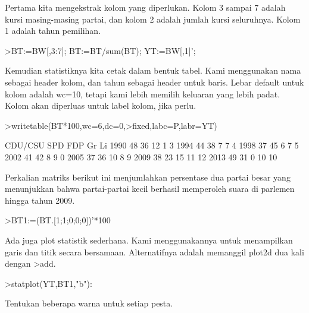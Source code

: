 \documentclass{article}
\begin{document}
\begin{eulernotebook}
\begin{eulercomment}
\begin{eulercomment}
\begin{eulercomment}
Pertama kita mengekstrak kolom yang diperlukan. Kolom 3 sampai 7
adalah kursi masing-masing partai, dan kolom 2 adalah jumlah kursi
seluruhnya. Kolom 1 adalah tahun pemilihan.
\end{eulercomment}
\begin{eulerprompt}
>BT:=BW[,3:7]; BT:=BT/sum(BT); YT:=BW[,1]';
\end{eulerprompt}
\begin{eulercomment}
Kemudian statistiknya kita cetak dalam bentuk tabel. Kami menggunakan
nama sebagai header kolom, dan tahun sebagai header untuk baris. Lebar
default untuk kolom adalah wc=10, tetapi kami lebih memilih keluaran
yang lebih padat. Kolom akan diperluas untuk label kolom, jika perlu.
\end{eulercomment}
\begin{eulerprompt}
>writetable(BT*100,wc=6,dc=0,>fixed,labc=P,labr=YT)
\end{eulerprompt}
\begin{euleroutput}
         CDU/CSU   SPD   FDP    Gr    Li
    1990      48    36    12     1     3
    1994      44    38     7     7     4
    1998      37    45     6     7     5
    2002      41    42     8     9     0
    2005      37    36    10     8     9
    2009      38    23    15    11    12
    2013      49    31     0    10    10
\end{euleroutput}
\begin{eulercomment}
Perkalian matriks berikut ini menjumlahkan persentase dua partai besar
yang menunjukkan bahwa partai-partai kecil berhasil memperoleh suara
di parlemen hingga tahun 2009.
\end{eulercomment}
\begin{eulerprompt}
>BT1:=(BT.[1;1;0;0;0])'*100
\end{eulerprompt}
\begin{euleroutput}
  [84.29,  81.25,  81.1659,  82.7529,  72.9642,  61.8971,  79.8732]
\end{euleroutput}
\begin{eulercomment}
Ada juga plot statistik sederhana. Kami menggunakannya untuk
menampilkan garis dan titik secara bersamaan. Alternatifnya adalah
memanggil plot2d dua kali dengan \textgreater{}add.
\end{eulercomment}
\begin{eulerprompt}
>statplot(YT,BT1,"b"):
\end{eulerprompt}
\begin{eulercomment}
Tentukan beberapa warna untuk setiap pesta.
\end{eulercomment}

\end{eulercomment}
\end{eulercomment}
\end{eulernotebook}
\end{document}
